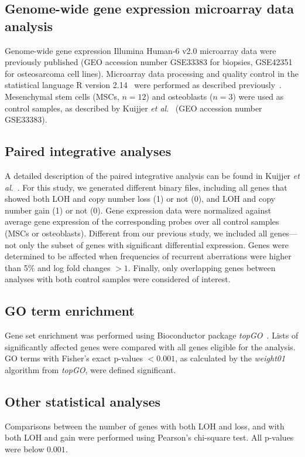 \subsection{Genome\hyp{}wide gene expression microarray data analysis}
Genome\hyp{}wide gene expression Illumina Human-6 v2.0 microarray data were previously published (GEO accession number GSE33383 for biopsies, GSE42351 for osteosarcoma cell lines). Microarray data processing and quality control in the statistical language R version 2.14~\cite{r2.14.0} were performed as described previously~\cite{buddingh2011tumor}. Mesenchymal stem cells (MSCs, $n=12$) and osteoblasts ($n=3$) were used as control samples, as described by Kuijjer {\it et al}.~\cite{kuijjer2012identification} (GEO accession number GSE33383).

\subsection{Paired integrative analyses}
A detailed description of the paired integrative analysis can be found in Kuijjer {\it et al}.~\cite{kuijjer2012identification}. For this study, we generated different binary files, including all genes that showed both LOH and copy number loss (1) or not (0), and LOH and copy number gain (1) or not (0). Gene expression data were normalized against average gene expression of the corresponding probes over all control samples (MSCs or osteoblasts). Different from our previous study, we included all genes---not only the subset of genes with significant differential expression. Genes were determined to be affected when frequencies of recurrent aberrations were higher than 5\% and log fold changes $>1$. Finally, only overlapping genes between analyses with both control samples were considered of interest.

\subsection{GO term enrichment}
Gene set enrichment was performed using Bioconductor package {\it topGO}~\cite{alexa2006improved}. Lists of significantly affected genes were compared with all genes eligible for the analysis. GO terms with Fisher's exact p-values $<0.001$, as calculated by the {\it weight01} algorithm from {\it topGO}, were defined significant.

\subsection{Other statistical analyses}
Comparisons between the number of genes with both LOH and loss, and with both LOH and gain were performed using Pearson's chi-square test. All p-values were below $0.001$.

